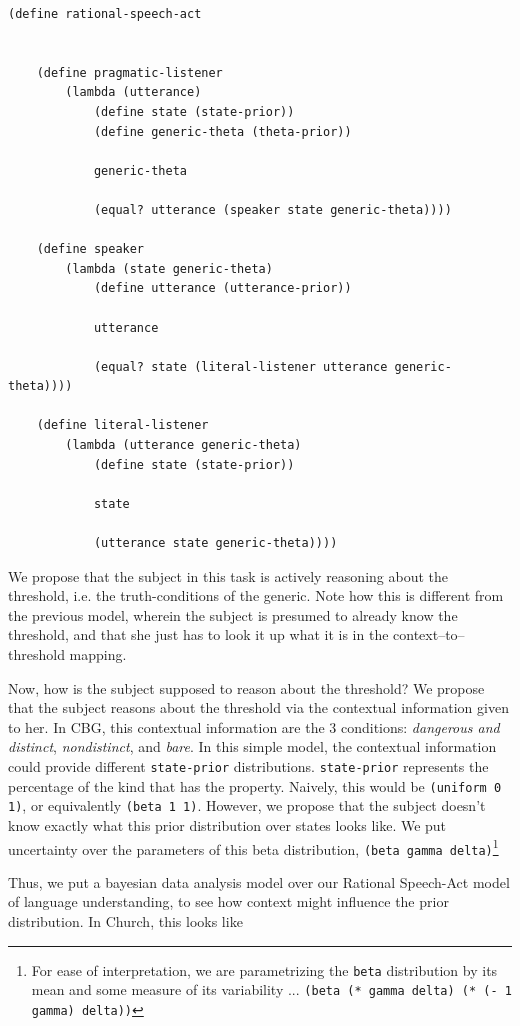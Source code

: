 \documentclass[10pt,letterpaper]{article}
\begin{document}
\begin{lstlisting}
(define rational-speech-act


	(define pragmatic-listener
		(lambda (utterance)
			(define state (state-prior))
			(define generic-theta (theta-prior))
			
			generic-theta
			
			(equal? utterance (speaker state generic-theta))))
			
	(define speaker 
		(lambda (state generic-theta)
			(define utterance (utterance-prior))
			
			utterance
			
			(equal? state (literal-listener utterance generic-theta))))
			
	(define literal-listener
		(lambda (utterance generic-theta)
			(define state (state-prior))
			
			state
			
			(utterance state generic-theta))))
\end{lstlisting}

We propose that the subject in this task is actively reasoning about the threshold, i.e. the truth-conditions of the generic. Note how this is different from the previous model, wherein the subject is presumed to already know the threshold, and that she just has to look it up what it is in the context--to--threshold mapping. 

Now, how is the subject supposed to reason about the threshold? We propose that the subject reasons about the threshold via the contextual information given to her. In CBG, this contextual information are the 3 conditions: \emph{dangerous and distinct}, \emph{nondistinct}, and \emph{bare}. In this simple model, the contextual information could provide different \lstinline{state-prior} distributions. \lstinline{state-prior} represents the percentage of the kind that has the property. Naively, this would be \lstinline{(uniform 0 1)}, or equivalently \lstinline{(beta 1 1)}. However, we propose that the subject doesn't know exactly what this prior distribution over states looks like. We put uncertainty over the parameters of this beta distribution, \lstinline{(beta gamma delta)}\footnote{For ease of interpretation, we are parametrizing the \lstinline{beta} distribution by its mean and some measure of its variability ... \lstinline{(beta (* gamma delta) (* (- 1 gamma) delta))}} 

Thus, we put a bayesian data analysis model over our Rational Speech-Act model of language understanding, to see how context might influence the prior distribution. In Church, this looks like
\end{document}
